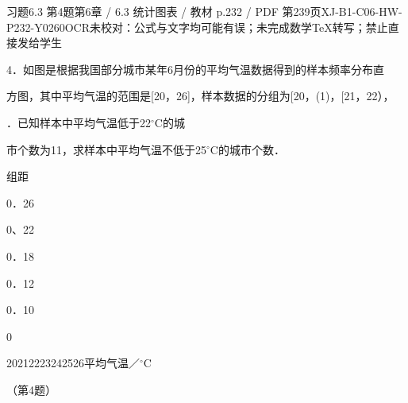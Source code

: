\begin{bankitem}{习题6.3 第4题}{第6章 / 6.3 统计图表 / 教材 p.232 / PDF 第239页}{XJ-B1-C06-HW-P232-Y0260}{OCR未校对：公式与文字均可能有误；未完成数学TeX转写；禁止直接发给学生}
\begin{ocrdraft}
\par
4．如图是根据我国部分城市某年6月份的平均气温数据得到的样本频率分布直
\par
方图，其中平均气温的范围是[20，26]，样本数据的分组为[20，(1)，[21，22），
\par
[22，23），[23，24），[24，25），[25，26]．已知样本中平均气温低于22\ensuremath{{}^\circ\mathrm C}的城
\par
市个数为11，求样本中平均气温不低于25\ensuremath{{}^\circ\mathrm C}的城市个数．
\par
组距
\par
0．26
\par
0、22
\par
0．18
\par
0．12
\par
0．10
\par
0
\par
20212223242526平均气温／\ensuremath{{}^\circ\mathrm C}
\par
（第4题）
\end{ocrdraft}
\end{bankitem}
